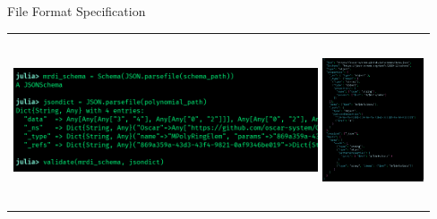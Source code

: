 \documentclass[9pt]{beamer}
\theoremstyle{definition}
\begin{document}
\begin{frame}[fragile]{File Format Specification}
  \begin{tabular}{c}
    \includegraphics[height=5cm, width=9cm]{images/schema-demo}
    \includegraphics[height=5cm, width=3cm]{images/schema}
    \end{tabular}
\end{frame}


\end{document}
